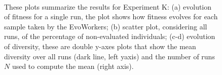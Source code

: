 \begin{figure}[t]
    \centering
    \\
    \caption{
    These plots summarize the results for Experiment K:
    (a) evolution of fitness for a single run, the plot shows how fitness evolves for each sample taken by the EvoWorkers;
    (b) scatter plot, considering all runs, of the percentage of non-evaluated individuals;
    (c-d) evolution of diversity, these are double y-axes plots that show the mean diversity over all runs (dark line, left yaxis) and the number of runs $N$
    used to compute the mean (right axis).}
    \label{fig:others}
\end{figure}

